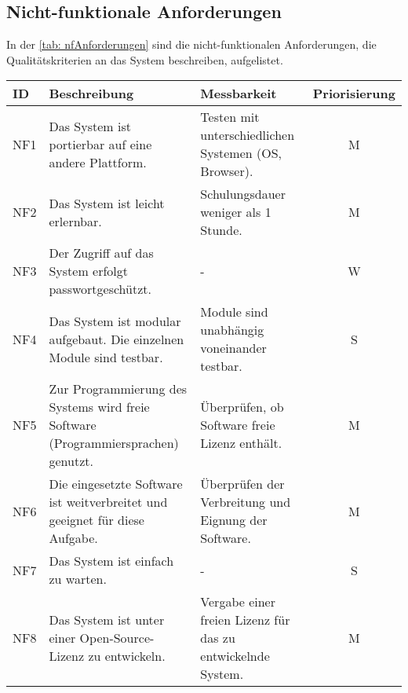 \subsection{Nicht-funktionale Anforderungen}
In der \autoref{tab: nfAnforderungen} sind die nicht-funktionalen Anforderungen, die Qualitätskriterien an das System
beschreiben, aufgelistet.
\begingroup
\setlength{\tabcolsep}{10pt} %
\renewcommand{\arraystretch}{1.25} 
\begin{table}[h]
    \centering
    \begin{adjustbox}{max width=\textwidth}
    \begin{tabular}{lp{7.5cm}p{7.5cm}c}
       \toprule
       \textbf{ID}          & \textbf{Beschreibung} & \textbf{Messbarkeit} & \textbf{Priorisierung}\\
       \midrule
        NF1                               &Das System ist portierbar auf eine andere Plattform. & Testen mit unterschiedlichen Systemen (OS, Browser). & M\\
        NF2                               &Das System ist leicht erlernbar.& Schulungsdauer weniger als 1 Stunde.  & M\\
        NF3                               &Der Zugriff auf das System erfolgt passwortgeschützt. & -  & W\\
        NF4                               &Das System ist modular aufgebaut. Die einzelnen Module sind testbar. & Module sind unabhängig voneinander testbar. & S\\
        NF5                               &Zur Programmierung des Systems wird freie Software (Programmiersprachen) genutzt. & Überprüfen, ob Software freie Lizenz enthält.  & M\\
        NF6                               &Die eingesetzte Software ist weitverbreitet und geeignet für diese Aufgabe. & Überprüfen der Verbreitung und Eignung der Software. & M\\
        NF7                               &Das System ist einfach zu warten. & - & S\\
        NF8                               &Das System ist unter einer Open-Source-Lizenz zu entwickeln. & Vergabe einer freien Lizenz für das zu entwickelnde System.  & M\\

\end{tabular}
\end{adjustbox}
\end{table}
